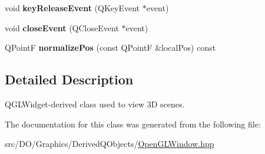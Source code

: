\begin{DoxyCompactItemize}
\item 
\hypertarget{class_d_o_1_1_open_g_l_window_a9e0db194f0850420e6bf556d821e6080}{void {\bfseries key\-Release\-Event} (Q\-Key\-Event $\ast$event)}\label{class_d_o_1_1_open_g_l_window_a9e0db194f0850420e6bf556d821e6080}

\item 
\hypertarget{class_d_o_1_1_open_g_l_window_a5de2bd09256045c0b96e5a0be780fa85}{void {\bfseries close\-Event} (Q\-Close\-Event $\ast$event)}\label{class_d_o_1_1_open_g_l_window_a5de2bd09256045c0b96e5a0be780fa85}

\item 
\hypertarget{class_d_o_1_1_open_g_l_window_acfea3dd2775b4090eb0f33ec7be9c74f}{Q\-Point\-F {\bfseries normalize\-Pos} (const Q\-Point\-F \&local\-Pos) const }\label{class_d_o_1_1_open_g_l_window_acfea3dd2775b4090eb0f33ec7be9c74f}

\end{DoxyCompactItemize}


\subsection{Detailed Description}
Q\-G\-L\-Widget-\/derived class used to view 3\-D scenes. 

The documentation for this class was generated from the following file\-:\begin{DoxyCompactItemize}
\item 
src/\-D\-O/\-Graphics/\-Derived\-Q\-Objects/\hyperlink{_open_g_l_window_8hpp}{Open\-G\-L\-Window.\-hpp}\end{DoxyCompactItemize}

